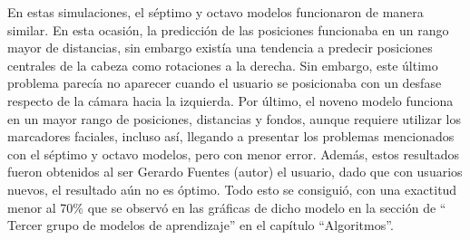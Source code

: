 En estas simulaciones, el séptimo y octavo modelos funcionaron de manera similar. En esta ocasión, la predicción de las posiciones funcionaba en un rango mayor de distancias, sin embargo existía una tendencia a predecir posiciones centrales de la cabeza como rotaciones a la derecha. Sin embargo, este último problema parecía no aparecer cuando el usuario se posicionaba con un desfase respecto de la cámara hacia la izquierda. Por último, el noveno modelo funciona en un mayor rango de posiciones, distancias y fondos, aunque requiere utilizar los marcadores faciales, incluso así, llegando a presentar los problemas mencionados con el séptimo y octavo modelos, pero con menor error. Además, estos resultados fueron obtenidos al ser Gerardo Fuentes (autor) el usuario, dado que con usuarios nuevos, el resultado aún no es óptimo. Todo esto se consiguió, con una exactitud menor al 70\% que se observó en las gráficas de dicho modelo en la sección de `` Tercer grupo de modelos de aprendizaje'' en el capítulo ``Algoritmos''.
